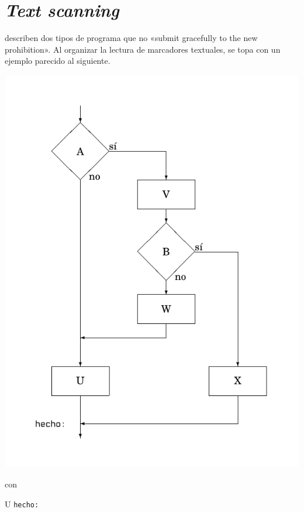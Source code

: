 \documentclass{tfg_domingo}
\begin{document}
\begin{tcolorbox}
\lipsum[11]
\end{tcolorbox}


\chapter{\emph{Text scanning}}


\citet{1972_Knuth} describen dos tipos de programa que no
«submit gracefully to the new prohibition». Al organizar la
lectura de marcadores textuales, \citet[p. 271]{1974_Knuth}
se topa con un ejemplo parecido al siguiente.

\begin{minipage}{.6\linewidth}
\begin{center}
\includegraphics[scale=.8]{diagrama}
\end{center}
\end{minipage}
\hfill
\begin{minipage}{.3\linewidth}
\begin{center}
\NoCaptionOfAlgo
\begin{algorithm}[H]
\caption{con}
\DontPrintSemicolon
{}
U\;
\texttt{hecho:}
\end{algorithm}
\end{center}
\end{minipage}
\end{document}
